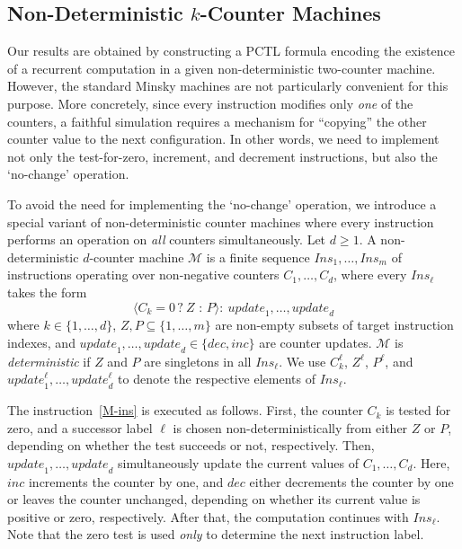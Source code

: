 \documentclass[a4paper,UKenglish,cleveref, autoref, thm-restate]{lipics-v2021}
\newcommand{\M}{\mathcal{M}}
\newcommand{\Ins}{\mathit{Ins}}
\newcommand{\update}{\textit{update}}
\newcommand{\Dec}{\textit{dec}}
\newcommand{\Inc}{\textit{inc}}
\begin{document}
\subsection{Non-Deterministic $k$-Counter Machines}
Our results are obtained by constructing a PCTL formula encoding the existence of a recurrent computation in a given non-deterministic two-counter machine. However, the standard Minsky machines \cite{Minsky:book} are not particularly convenient for this purpose. More concretely, since every instruction modifies only \emph{one} of the counters, a faithful simulation requires a mechanism for ``copying'' the other counter value to the next configuration. In other words, we need to implement not only the test-for-zero, increment, and decrement instructions, but also the `no-change' operation. 

To avoid the need for implementing the `no-change' operation, we introduce a special variant of non-deterministic counter machines where every instruction performs an operation on \emph{all} counters simultaneously. 
Let $d \geq 1$. A non-deterministic $d$-counter machine $\M$ is a finite sequence $\Ins_1, \ldots, \Ins_m$ of instructions operating over non-negative counters $C_1,\ldots,C_d$, where every $\Ins_\ell$ takes the form
\begin{equation}
   \langle C_k{=}0\, {?}\ Z \mbox{ : } P\rangle:\ \update_1, \ldots, \update_d
   \label{M-ins}
\end{equation}
where $k \in \{1,\ldots,d\}$, $Z,P \subseteq \{1,\ldots,m\}$ are non-empty subsets of target instruction indexes, and $\update_1,\ldots,\update_d \in \{\Dec,\Inc\}$ are counter updates.  $\M$ is \emph{deterministic} if $Z$ and $P$ are singletons in all $\Ins_\ell$. We use $C_k^\ell$, $Z^\ell$, $P^\ell$, and $\update_1^\ell, \ldots,\update_d^\ell$ to denote the respective elements of $\Ins_\ell$.

The instruction~\eqref{M-ins} is executed as follows. First, the counter $C_k$ is tested for zero, and a successor label $\ell$ is chosen non-deterministically from either $Z$ or $P$, depending on whether the test succeeds or not, respectively. Then, $\update_1,\ldots,\update_d$ simultaneously update the current values of $C_1,\ldots,C_d$. Here, $\Inc$ increments the counter by one, and $\Dec$ either decrements the counter by one or leaves the counter unchanged, depending on whether its current value is positive or zero, respectively. After that, the computation continues with $\Ins_\ell$. Note that the zero test is used \emph{only} to determine the next instruction label.
\end{document}
